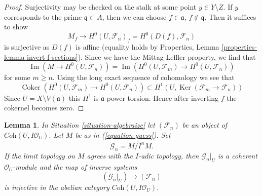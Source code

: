 \documentclass{stacks-project}
\theoremstyle{plain}
\newtheorem{lemma}[subsection]{Lemma}
\theoremstyle{definition}
\theoremstyle{remark}
\numberwithin{equation}{subsection}
\def\Ker{\mathop{\mathrm{Ker}}}
\def\Im{\mathop{\mathrm{Im}}}
\def\Coker{\mathop{\mathrm{Coker}}}
\begin{document}
\begin{proof}
Surjectivity may be checked on the stalk at some point $y \in Y \setminus Z$.
If $y$ corresponds to the prime $\mathfrak q \subset A$, then we can
choose $f \in \mathfrak a$, $f \not \in \mathfrak q$. Then it suffices
to show
$$
M_f \longrightarrow H^0(U, \mathcal{F}_n)_f = H^0(D(f), \mathcal{F}_n)
$$
is surjective as $D(f)$ is affine (equality holds by Properties,
Lemma \ref{properties-lemma-invert-f-sections}). Since we have the
Mittag-Leffler property, we find that
$$
\Im(M \to H^0(U, \mathcal{F}_n)) =
\Im(H^0(U, \mathcal{F}_m) \to H^0(U, \mathcal{F}_n))
$$
for some $m \geq n$. Using the long exact sequence of cohomology we see
that
$$
\Coker(H^0(U, \mathcal{F}_m) \to H^0(U, \mathcal{F}_n))
\subset
H^1(U, \Ker(\mathcal{F}_m \to \mathcal{F}_n))
$$
Since $U = X \setminus V(\mathfrak a)$ this $H^1$ is $\mathfrak a$-power
torsion. Hence after inverting $f$ the cokernel becomes zero.
\end{proof}

\begin{lemma}
\label{lemma-when-topology}
In Situation \ref{situation-algebraize} let $(\mathcal{F}_n)$ be an object
of $\textit{Coh}(U, I\mathcal{O}_U)$. Let $M$ be as in (\ref{equation-guess}).
Set
$$
\mathcal{G}_n = \widetilde{M/I^nM}.
$$
If the limit topology on $M$ agrees with the $I$-adic topology, then
$\mathcal{G}_n|_U$ is a coherent
$\mathcal{O}_U$-module and the map of inverse systems
$$
(\mathcal{G}_n|_U) \longrightarrow (\mathcal{F}_n)
$$
is injective in the abelian category $\textit{Coh}(U, I\mathcal{O}_U)$.
\end{lemma}
\end{document}
